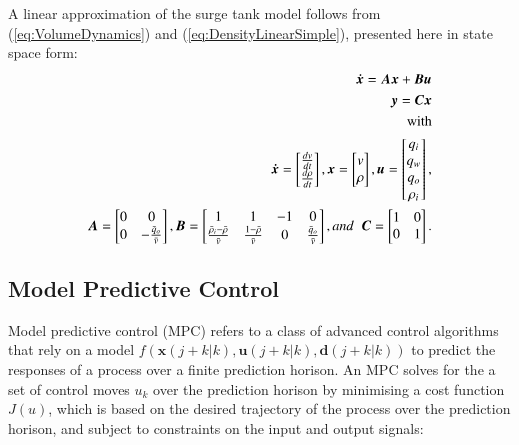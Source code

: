 \documentclass[preprint,authoryear,12pt]{elsarticle}
\begin{document}
A linear approximation of the surge tank model follows from (\ref{eq:VolumeDynamics}) and (\ref{eq:DensityLinearSimple}), presented here in state space form:
\begin{align}
	\begin{split}
	\boldsymbol{\dot{x}} = \boldsymbol{A}\boldsymbol{x} + \boldsymbol{B}\boldsymbol{u} \\
	\boldsymbol{y} = \boldsymbol{C}\boldsymbol{x}\\
	\text{with} \\
	\boldsymbol{\dot{x}} = \begin{bmatrix} \frac{dv}{dt} \\ \frac{d\rho}{dt} \end{bmatrix}, \boldsymbol{x} = \begin{bmatrix} v \\ \rho \end{bmatrix}, \boldsymbol{u} = \begin{bmatrix} q_i \\ q_w \\ q_o \\ \rho_i \end{bmatrix}, \\ 
	\boldsymbol{A} = \begin{bmatrix} 0 & 0 \\ 0 & -\frac{\bar{q}_o}{\bar{v}}  \end{bmatrix}, 
	\boldsymbol{B} = \begin{bmatrix} 1 & 1 & -1 & 0 \\ \frac{\bar{\rho}_i - \bar{\rho}}{\bar{v}} & \frac{1 - \bar{\rho}}{\bar{v}} & 0 & \frac{\bar{q}_o}{\bar{v}} \end{bmatrix}, and \hspace{2mm}
	\boldsymbol{C} = \begin{bmatrix} 1 & 0 \\ 0 & 1  \end{bmatrix}. \\
	\end{split}
	\label{eq:LinearModel}
\end{align}

\subsection{Model Predictive Control}\label{sec:MPC}
Model predictive control (MPC) refers to a class of advanced control algorithms that rely on a model $f(\boldsymbol{x}(j + k|k), \boldsymbol{u}(j + k|k), \boldsymbol{d}(j + k|k))$ to predict the responses of a process over a finite prediction horison. An MPC solves for the a set of control moves $u_k$ over the prediction horison by minimising a cost function $J(u)$, which is based on the desired trajectory of the process over the prediction horison, and subject to constraints on the input and output signals:
\end{document}
